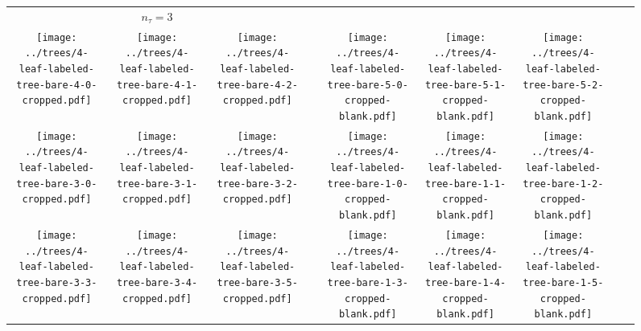 \documentclass[border=10pt,varwidth=30cm]{standalone}
\newcommand{\ndivs}{\ensuremath{n_{\tau}}\xspace}
\newcommand{\pltwidth}{0.1}
\newcommand{\catspace}{0.02}
\begin{document}
\begin{figure}
    \setlength\arrayrulewidth{2pt}
    \centering
    \begin{tabular}{@{}ccccccccc@{}}
        \multicolumn{3}{c}{\LARGE $\ndivs = 3$} & & \multicolumn{3}{c}{ } & & { } \\[1ex]
        \texttt{[image: ../trees/4-leaf-labeled-tree-bare-4-0-cropped.pdf]}
        &
        \texttt{[image: ../trees/4-leaf-labeled-tree-bare-4-1-cropped.pdf]}
        &
        \texttt{[image: ../trees/4-leaf-labeled-tree-bare-4-2-cropped.pdf]}
        &
        \hspace{\catspace\textwidth}
        &
        \texttt{[image: ../trees/4-leaf-labeled-tree-bare-5-0-cropped-blank.pdf]}
        &
        \texttt{[image: ../trees/4-leaf-labeled-tree-bare-5-1-cropped-blank.pdf]}
        &
        \texttt{[image: ../trees/4-leaf-labeled-tree-bare-5-2-cropped-blank.pdf]}
        &
        \hspace{\catspace\textwidth}
        &
        \\
        \texttt{[image: ../trees/4-leaf-labeled-tree-bare-3-0-cropped.pdf]}
        &
        \texttt{[image: ../trees/4-leaf-labeled-tree-bare-3-1-cropped.pdf]}
        &
        \texttt{[image: ../trees/4-leaf-labeled-tree-bare-3-2-cropped.pdf]}
        &
        &
        \texttt{[image: ../trees/4-leaf-labeled-tree-bare-1-0-cropped-blank.pdf]}
        &
        \texttt{[image: ../trees/4-leaf-labeled-tree-bare-1-1-cropped-blank.pdf]}
        &
        \texttt{[image: ../trees/4-leaf-labeled-tree-bare-1-2-cropped-blank.pdf]}
        &
        &
        \\
        \texttt{[image: ../trees/4-leaf-labeled-tree-bare-3-3-cropped.pdf]}
        &
        \texttt{[image: ../trees/4-leaf-labeled-tree-bare-3-4-cropped.pdf]}
        &
        \texttt{[image: ../trees/4-leaf-labeled-tree-bare-3-5-cropped.pdf]}
        &
        &
        \texttt{[image: ../trees/4-leaf-labeled-tree-bare-1-3-cropped-blank.pdf]}
        &
        \texttt{[image: ../trees/4-leaf-labeled-tree-bare-1-4-cropped-blank.pdf]}
        &
        \texttt{[image: ../trees/4-leaf-labeled-tree-bare-1-5-cropped-blank.pdf]}

\end{tabular}
\end{figure}
\end{document}
